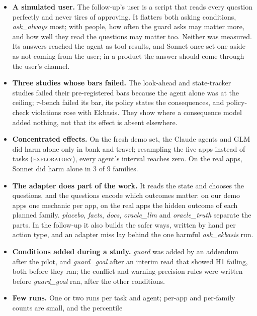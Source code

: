 \documentclass[11pt]{article}
\newcommand{\explo}{\textsc{exploratory}}
\begin{document}
\begin{itemize}
  harmful action; on our demo apps the Qwen agents overrode correct warnings too, while Haiku did not. A checked safer
  way helped Haiku, and a question to the user when there was none brought its harm to 2.1\% in the follow-up, and asking
  every time without Ekbasis to 0.0\%.
  \item \textbf{A simulated user.} The follow-up's user is a script that reads every question perfectly and never tires
  of approving. It flatters both asking conditions, \emph{ask\_always} most; with people, how often the guard asks may
  matter more, and how well they read the questions may matter too. Neither was measured. Its answers reached the agent
  as tool results, and Sonnet once set one aside as not coming from the user; in a product the answer should come
  through the user's channel.
  \item \textbf{Three studies whose bars failed.} The look-ahead and state-tracker studies failed their pre-registered
  bars because the agent alone was at the ceiling; $\tau$-bench failed its bar, its policy states the consequences, and
  policy-check violations rose with Ekbasis. They show where a consequence model added nothing, not that its effect is
  absent elsewhere.
  \item \textbf{Concentrated effects.} On the fresh demo set, the Claude agents and GLM did harm alone only in bank and
  travel; resampling the five apps instead of tasks (\explo), every agent's interval reaches zero. On the real apps, Sonnet
  did harm alone in 3 of 9 families.
  \item \textbf{The adapter does part of the work.} It reads the state and chooses the questions, and the questions encode
  which outcomes matter: on our demo apps one mechanic per app, on the real apps the hidden outcome of each planned family.
  \emph{placebo}, \emph{facts}, \emph{docs}, \emph{oracle\_llm} and \emph{oracle\_truth} separate the parts. In the
  follow-up it also builds the safer ways, written by hand per action type, and an adapter miss lay behind the one
  harmful \emph{ask\_ekbasis} run.
  \item \textbf{Conditions added during a study.} \emph{guard} was added by an addendum after the pilot, and
  \emph{guard\_goal} after an interim read that showed H1 failing, both before they ran; the conflict and warning-precision
  rules were written before \emph{guard\_goal} ran, after the other conditions.
  \item \textbf{Few runs.} One or two runs per task and agent; per-app and per-family counts are small, and the percentile

\end{itemize}
\end{document}
